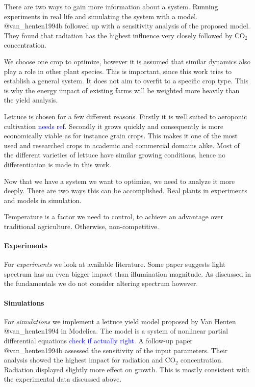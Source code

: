 There are two ways to gain more information about a system.
Running experiments in real life and simulating the system with a model.
@van\_henten1994b followed up with a sensitivity analysis of the proposed model.
They found that radiation has the highest influence very closely followed by CO$_2$ concentration.

We choose one crop to optimize, however it is assumed that similar dynamics also play a role in other plant species.
This is important, since this work tries to establish a general system.
It does not aim to overfit to a specific crop type.
This is why the energy impact of existing farms will be weighted more heavily than the yield analysis.

Lettuce is chosen for a few different reasons.
Firstly it is well suited to aeroponic cultivation \textcolor{Blue}{needs ref}.
Secondly it grows quickly and consequently is more economically viable as for instance grain crops.
This makes it one of the most used and researched crops in academic and commercial domains alike.
Most of the different varieties of lettuce have similar growing conditions, hence no differentiation is made in this work.

Now that we have a system we want to optimize, we need to analyze it more deeply.
There are two ways this can be accomplished.
Real plants in experiments and models in simulation.

Temperature is a factor we need to control, to achieve an advantage over traditional agriculture.
Otherwise, non-competitive.

\paragraph{Experiments}
For \textit{experiments} we look at available literature.
Some paper suggests light spectrum has an even bigger impact than illumination magnitude.
As discussed in the fundamentals we do not consider altering spectrum however.

\paragraph{Simulations}
For \textit{simulations} we implement a lettuce yield model proposed by Van Henten @van\_henten1994 in Modelica.
The model is a system of nonlinear partial differential equations \textcolor{Blue}{check if actually right}.
A follow-up paper @van\_henten1994b assessed the sensitivity of the input parameters.
Their analysis showed the highest impact for radiation and CO$_2$ concentration.
Radiation displayed slightly more effect on growth.
This is mostly consistent with the experimental data discussed above.

